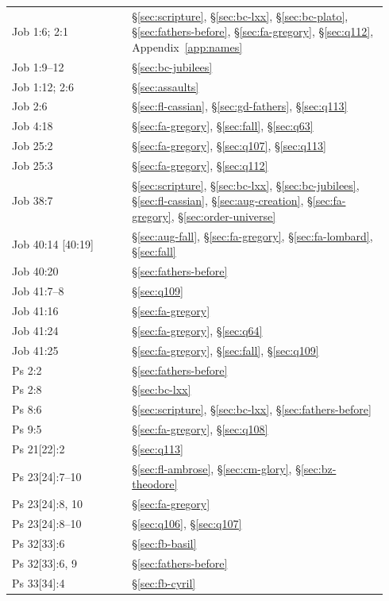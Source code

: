 \begin{longtable}{>{\raggedright\arraybackslash}p{0.30\linewidth}>{\raggedright\arraybackslash}p{0.64\linewidth}}
Job 1:6; 2:1 & \S\ref{sec:scripture}, \S\ref{sec:bc-lxx}, \S\ref{sec:bc-plato}, \S\ref{sec:fathers-before}, \S\ref{sec:fa-gregory}, \S\ref{sec:q112}, Appendix~\ref{app:names}\\
Job 1:9--12 & \S\ref{sec:bc-jubilees}\\
Job 1:12; 2:6 & \S\ref{sec:assaults}\\
Job 2:6 & \S\ref{sec:fl-cassian}, \S\ref{sec:gd-fathers}, \S\ref{sec:q113}\\
Job 4:18 & \S\ref{sec:fa-gregory}, \S\ref{sec:fall}, \S\ref{sec:q63}\\
Job 25:2 & \S\ref{sec:fa-gregory}, \S\ref{sec:q107}, \S\ref{sec:q113}\\
Job 25:3 & \S\ref{sec:fa-gregory}, \S\ref{sec:q112}\\
Job 38:7 & \S\ref{sec:scripture}, \S\ref{sec:bc-lxx}, \S\ref{sec:bc-jubilees}, \S\ref{sec:fl-cassian}, \S\ref{sec:aug-creation}, \S\ref{sec:fa-gregory}, \S\ref{sec:order-universe}\\
Job 40:14 [40:19] & \S\ref{sec:aug-fall}, \S\ref{sec:fa-gregory}, \S\ref{sec:fa-lombard}, \S\ref{sec:fall}\\
Job 40:20 & \S\ref{sec:fathers-before}\\
Job 41:7--8 & \S\ref{sec:q109}\\
Job 41:16 & \S\ref{sec:fa-gregory}\\
Job 41:24 & \S\ref{sec:fa-gregory}, \S\ref{sec:q64}\\
Job 41:25 & \S\ref{sec:fa-gregory}, \S\ref{sec:fall}, \S\ref{sec:q109}\\
Ps 2:2 & \S\ref{sec:fathers-before}\\
Ps 2:8 & \S\ref{sec:bc-lxx}\\
Ps 8:6 & \S\ref{sec:scripture}, \S\ref{sec:bc-lxx}, \S\ref{sec:fathers-before}\\
Ps 9:5 & \S\ref{sec:fa-gregory}, \S\ref{sec:q108}\\
Ps 21[22]:2 & \S\ref{sec:q113}\\
Ps 23[24]:7--10 & \S\ref{sec:fl-ambrose}, \S\ref{sec:cm-glory}, \S\ref{sec:bz-theodore}\\
Ps 23[24]:8, 10 & \S\ref{sec:fa-gregory}\\
Ps 23[24]:8--10 & \S\ref{sec:q106}, \S\ref{sec:q107}\\
Ps 32[33]:6 & \S\ref{sec:fb-basil}\\
Ps 32[33]:6, 9 & \S\ref{sec:fathers-before}\\
Ps 33[34]:4 & \S\ref{sec:fb-cyril}\\

\end{longtable}

